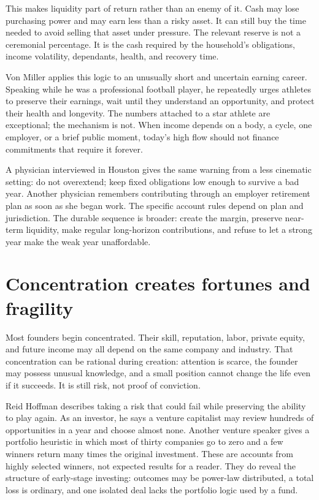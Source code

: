 This makes liquidity part of return rather than an enemy of it. Cash may lose
purchasing power and may earn less than a risky asset. It can still buy the
time needed to avoid selling that asset under pressure. The relevant reserve
is not a ceremonial percentage. It is the cash required by the household's
obligations, income volatility, dependants, health, and recovery time.

Von Miller applies this logic to an unusually short and uncertain earning
career. Speaking while he was a professional football player, he repeatedly
urges athletes to preserve their earnings, wait until they understand an
opportunity, and protect their health and longevity. The numbers attached to a
star athlete are exceptional; the mechanism is not. When income depends on a
body, a cycle, one employer, or a brief public moment, today's high flow should
not finance commitments that require it forever.

A physician interviewed in Houston gives the same warning from a less
cinematic setting: do not overextend; keep fixed obligations low enough to
survive a bad year. Another physician remembers contributing through an
employer retirement plan as soon as she began work. The specific account rules
depend on plan and jurisdiction. The durable sequence is broader: create the
margin, preserve near-term liquidity, make regular long-horizon contributions,
and refuse to let a strong year make the weak year unaffordable.

\section{Concentration creates fortunes and fragility}

Most founders begin concentrated. Their skill, reputation, labor, private
equity, and future income may all depend on the same company and industry.
That concentration can be rational during creation: attention is scarce, the
founder may possess unusual knowledge, and a small position cannot change the
life even if it succeeds. It is still risk, not proof of conviction.

Reid Hoffman describes taking a risk that could fail while preserving the
ability to play again. As an investor, he says a venture capitalist may review
hundreds of opportunities in a year and choose almost none. Another venture
speaker gives a portfolio heuristic in which most of thirty companies go to
zero and a few winners return many times the original investment. These are
accounts from highly selected winners, not expected results for a reader.
They do reveal the structure of early-stage investing: outcomes may be
power-law distributed, a total loss is ordinary, and one isolated deal lacks
the portfolio logic used by a fund.

